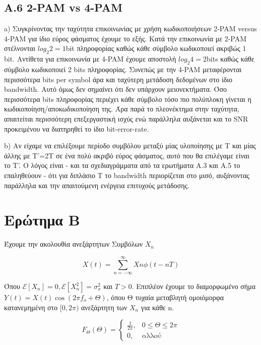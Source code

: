 \documentclass[11pt]{article}
\begin{document}
    \subsection*{A.6 2-PAM vs 4-PAM}
    a) Συγκρίνοντας την ταχύτητα επικοινωνίας με χρήση κωδικοποιήσεων 2-PAM versus 4-PAM για ίδιο εύρος φάσματος έχουμε το εξής. 
    Κατά την επικοινωνία με 2-PAM στέλνονται $log_2 2=1$bit πληροφορίας καθώς κάθε σύμβολο κωδικοποιεί ακριβώς 1 bit.
    Αντίθετα για επικοινωνία με 4-PAM έχουμε αποστολή $log_2 4 =2$bits καθώς κάθε σύμβολο κωδικοποιεί 2 bits πληροφορίας.
    Συνεπώς με την 4-PAM μεταφέρονται περισσότερα bits per symbol άρα και ταχύτερη μετάδοση δεδομένων στο ίδιο bandwidth. 
    Αυτό όμως δεν σημαίνει ότι δεν υπάρχουν μειονεκτήματα.
    Όσο περισσότερα bits πληροφορίας περιέχει κάθε σύμβολο τόσο πιο πολύπλοκη γίνεται η κωδικοποίηση/αποκωδικοποίηση της.
    Άρα παρά το πλεονέκτημα στην ταχύτητα, απαιτείται περισσότερη επεξεργαστική ισχύς ενώ παράλληλα αυξάνεται και το SNR προκειμένου να διατηρηθεί το ίδιο bit-error-rate. 
    
    \par \noindent
    b) Αν είχαμε να επιλέξουμε περίοδο συμβόλου μεταξύ μίας υλοποίησης με Τ και μίας άλλης με Τ'=2Τ σε ένα πολύ ακριβό εύρος φάσματος, αυτό που θα επιλέγαμε είναι το Τ'. 
    Ο λόγος είναι - και τα σχεδιαγράμματα από τα ερωτήματα Α.3 και Α.5 το επαληθεύουν - ότι για διπλάσιο Τ το bandwidth περιορίζεται στο μισό, αυξάνοντας παράλληλα και την απαιτούμενη ενέργεια επιτυχούς μετάδοσης.
    
    
    
    \section*{Ερώτημα B}
    Έχουμε την ακολουθία ανεξάρτητων Συμβόλων $X_n$
    
    \[ X(t) = \sum_{n=-\infty}^{\infty} Xn\phi(t-nT) \]
    
    \par \noindent
    Όπου $\mathcal{E}[X_n]=0, \mathcal{E}[X_n^2]=\sigma_x^2$ και $T>0$. Επιπλέον έχουμε το διαμορφωμένο σήμα $Y(t) = X(t)\cos(2 \pi f_o + \Theta)$, όπου Θ τυχαία μεταβλητή ομοιόμορφα κατανεμημένη στο $[0,2\pi)$ ανεξάρτητη των $X_n$ για κάθε n.
    
    \[  
        F_{\Theta}(\Theta) = \left\{ 
                    \begin{array}{rcl}
                        \frac{1}{2\pi}, & 0 \leq \Theta \leq 2\pi \\ 
                        0,  & \text{αλλού}
                    \end{array}
                \right.
    \]
    
\end{document}
